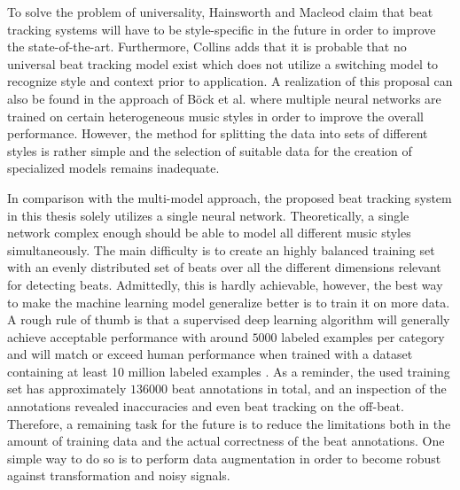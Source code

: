\documentclass{scrartcl}
\begin{document}

To solve the problem of universality, Hainsworth and Macleod \cite{Hainsworth2004} claim that beat tracking systems will have to be style-specific in the future in order to improve the state-of-the-art. Furthermore, Collins \cite{Collins2006} adds that it is probable that no universal beat tracking model exist which does not utilize a switching model to recognize style and context prior to application. A realization of this proposal can also be found in the approach of Böck et al. \cite{Boeck2014} where multiple neural networks are trained on certain heterogeneous music styles in order to improve the overall performance. However, the method for splitting the data into sets of different styles is rather simple and the selection of suitable data for the creation of specialized models remains inadequate. 

In comparison with the multi-model approach, the proposed beat tracking system in this thesis solely utilizes a single neural network. Theoretically, a single network complex enough should be able to  model all different music styles simultaneously. The main difficulty is to create an highly balanced training set with an evenly distributed set of beats over all the different dimensions relevant for detecting beats. Admittedly, this is hardly achievable, however, the best way to make the machine learning model generalize better is to train it on more data. A rough rule of thumb is that a supervised deep learning algorithm will generally achieve acceptable performance with around $\num{5000}$ labeled examples per category and will match or exceed human performance when trained with a dataset containing at least 10 million labeled examples \cite{Goodfellow2016}. As a reminder, the used training set has approximately $\num{136000}$ beat annotations in total, and an inspection of the annotations revealed inaccuracies and even beat tracking on the off-beat. Therefore, a remaining task for the future is to reduce the limitations both in the amount of training data and the actual correctness of the beat annotations. One simple way to do so is to perform data augmentation in order to become robust against transformation and noisy signals. 
\end{document}

